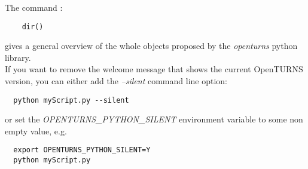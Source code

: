 The command :
\begin{center}
  \begin{lstlisting}
    dir()
  \end{lstlisting}
\end{center}
gives a general overview of the whole objects proposed by the \emph{openturns} python library.\\

If you want to remove the welcome message that shows the current OpenTURNS version, you can either add the {\itshape --silent} command line option:
\begin{verbatim}
  python myScript.py --silent
\end{verbatim}

or set the {\itshape OPENTURNS\_PYTHON\_SILENT} environment variable to some non empty value, e.g.

\begin{verbatim}
  export OPENTURNS_PYTHON_SILENT=Y
  python myScript.py
\end{verbatim}


